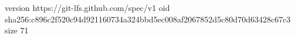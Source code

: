 version https://git-lfs.github.com/spec/v1
oid sha256:c896c2f520c94d921160734a324bbd5ec008af2067852d5c80d70d63428c67c3
size 71
